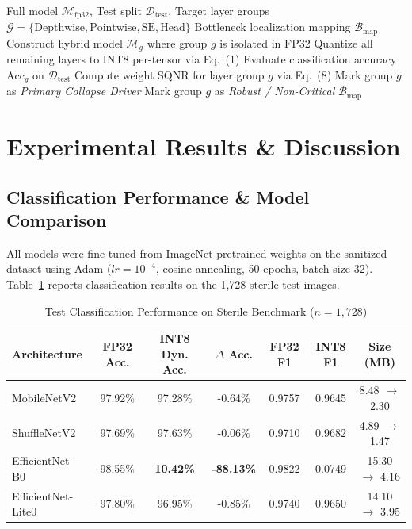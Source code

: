 \documentclass[11pt,a4paper]{article}
\begin{document}
\begin{algorithm}[H]
\caption{Layer-Wise Quantization Sensitivity Localization}
\begin{algorithmic}[1]
\Require Full model $\mathcal{M}_{\text{fp32}}$, Test split $\mathcal{D}_{\text{test}}$, Target layer groups $\mathcal{G} = \{\text{Depthwise}, \text{Pointwise}, \text{SE}, \text{Head}\}$
\Ensure Bottleneck localization mapping $\mathcal{B}_{\text{map}}$
    \State Construct hybrid model $\mathcal{M}_g$ where group $g$ is isolated in FP32
    \State Quantize all remaining layers to INT8 per-tensor via Eq.~(1)
    \State Evaluate classification accuracy $\text{Acc}_g$ on $\mathcal{D}_{\text{test}}$
    \State Compute weight SQNR for layer group $g$ via Eq.~(8)
        \State Mark group $g$ as \textit{Primary Collapse Driver}
    \Else
        \State Mark group $g$ as \textit{Robust / Non-Critical}
    \EndIf
\EndFor
\State \Return $\mathcal{B}_{\text{map}}$
\end{algorithmic}
\end{algorithm}

\section{Experimental Results & Discussion}

\subsection{Classification Performance & Model Comparison}
All models were fine-tuned from ImageNet-pretrained weights on the sanitized dataset using Adam ($lr = 10^{-4}$, cosine annealing, 50 epochs, batch size 32). Table~\ref{tab:results} reports classification results on the 1,728 sterile test images.

\begin{table}[htbp]
\centering
\caption{Test Classification Performance on Sterile Benchmark ($n=1,728$)}
\label{tab:results}
\small
\begin{tabular}{lcccccc}
\toprule
\textbf{Architecture} & \textbf{FP32 Acc.} & \textbf{INT8 Dyn. Acc.} & \textbf{$\Delta$ Acc.} & \textbf{FP32 F1} & \textbf{INT8 F1} & \textbf{Size (MB)} \\
\midrule
MobileNetV2 & 97.92\% & 97.28\% & -0.64\% & 0.9757 & 0.9645 & 8.48 $\rightarrow$ 2.30 \\
ShuffleNetV2 & 97.69\% & 97.63\% & -0.06\% & 0.9710 & 0.9682 & 4.89 $\rightarrow$ 1.47 \\
EfficientNet-B0 & 98.55\% & \textbf{10.42\%} & \textbf{-88.13\%} & 0.9822 & 0.0749 & 15.30 $\rightarrow$ 4.16 \\
EfficientNet-Lite0 & 97.80\% & 96.95\% & -0.85\% & 0.9740 & 0.9650 & 14.10 $\rightarrow$ 3.95 \\
\bottomrule
\end{tabular}
\end{table}
\end{document}
